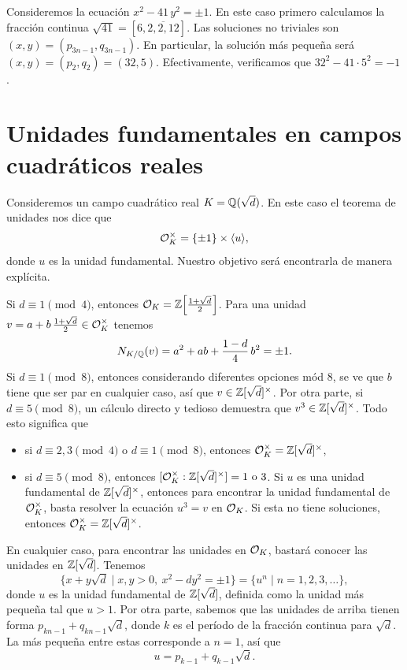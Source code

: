 \begin{ejemplo}
  Consideremos la ecuación $x^2 - 41\,y^2 = \pm 1$. En este caso primero
  calculamos la fracción continua $\sqrt{41} = [6, \overline{2,2,12}]$.
  Las soluciones no triviales son $(x,y) = (p_{3n-1}, q_{3n-1})$. En particular,
  la solución más pequeña será $(x,y) = (p_2,q_2) = (32,5)$.
  Efectivamente, verificamos que $32^2 - 41\cdot 5^2 = -1$.
\end{ejemplo}


\section{Unidades fundamentales en campos cuadráticos reales}

Consideremos un campo cuadrático real $K = \mathbb{Q} (\sqrt{d})$. En este caso el
teorema de unidades nos dice que
$$\mathcal{O}_K^\times = \{ \pm 1 \} \times \langle u\rangle,$$
donde $u$ es la unidad fundamental. Nuestro objetivo será encontrarla de manera
explícita.

Si $d \equiv 1 \pmod{4}$, entonces
$\mathcal{O}_K = \mathbb{Z} \Bigl[\frac{1+\sqrt{d}}{2}\Bigr]$. Para una unidad
$v = a + b\,\frac{1+\sqrt{d}}{2} \in \mathcal{O}_K^\times$ tenemos
$$N_{K/\mathbb{Q}} (v) = a^2 + ab + \frac{1 - d}{4}\,b^2 = \pm 1.$$
Si $d \equiv 1 \pmod{8}$, entonces considerando diferentes opciones mód $8$,
se ve que $b$ tiene que ser par en cualquier caso, así que
$v \in \mathbb{Z} [\sqrt{d}]^\times$. Por otra parte, si $d \equiv 5 \pmod{8}$, un
cálculo directo y tedioso demuestra que $v^3 \in \mathbb{Z} [\sqrt{d}]^\times$.
Todo esto significa que
\begin{itemize}
\item si $d \equiv 2,3 \pmod{4}$ o $d \equiv 1 \pmod{8}$, entonces
  $\mathcal{O}_K^\times = \mathbb{Z} [\sqrt{d}]^\times$,

\item si $d \equiv 5 \pmod{8}$, entonces
  $[\mathcal{O}_K^\times : \mathbb{Z} [\sqrt{d}]^\times] = 1\text{ o }3$.
  Si $u$ es una unidad fundamental de $\mathbb{Z} [\sqrt{d}]^\times$, entonces para
  encontrar la unidad fundamental de $\mathcal{O}_K^\times$, basta resolver la ecuación
  $u^3 = v$ en $\mathcal{O}_K$. Si esta no tiene soluciones, entonces
  $\mathcal{O}_K^\times = \mathbb{Z} [\sqrt{d}]^\times$.
\end{itemize}
En cualquier caso, para encontrar las unidades en $\mathcal{O}_K$, bastará conocer las
unidades en $\mathbb{Z} [\sqrt{d}]$. Tenemos
\[ \{ x + y\sqrt{d} \mid x,y > 0, ~ x^2 - dy^2 = \pm 1 \} =
\{ u^n \mid n = 1,2,3,\ldots \}, \]
donde $u$ es la unidad fundamental de $\mathbb{Z} [\sqrt{d}]$, definida como la unidad
más pequeña tal que $u > 1$. Por otra parte, sabemos que las unidades de arriba
tienen forma $p_{kn-1} + q_{kn-1}\sqrt{d}$, donde $k$ es el período de la fracción
continua para $\sqrt{d}$. La más pequeña entre estas corresponde a $n = 1$, así
que
$$u = p_{k-1} + q_{k-1}\sqrt{d}.$$

